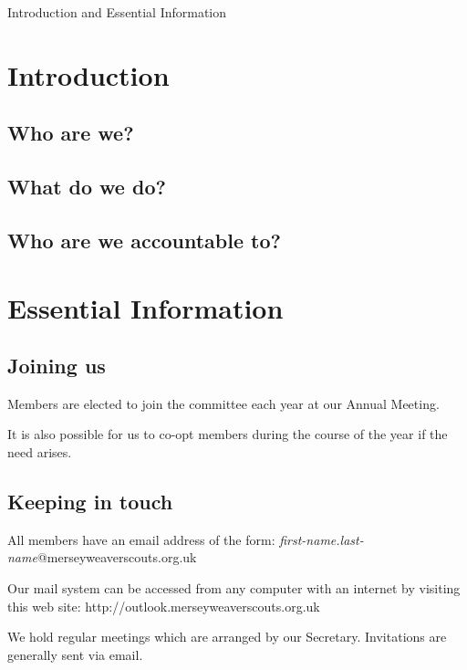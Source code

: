 \documentclass[12pt,foldmark,notumble]{leaflet}
\begin{document}
{Introduction and Essential Information}

\withrotationtrue
\section{Introduction}
\withrotationfalse

\subsection{Who are we?}

\subsection{What do we do?}

\subsection{Who are we accountable to?}
\newpage

\withrotationtrue
\section{Essential Information}
\withrotationfalse
\subsection{Joining us}
Members are elected to join the committee each year at our Annual Meeting.

It is also possible for us to co-opt members during the course of the year if the need arises.

\subsection{Keeping in touch}
All members have an email address of the form: \textit{first-name.last-name}@merseyweaverscouts.org.uk

Our mail system can be accessed from any computer with an internet by visiting this web site: http://outlook.merseyweaverscouts.org.uk

We hold regular meetings which are arranged by our Secretary. Invitations are generally sent via email.
\newpage




\end{document}
